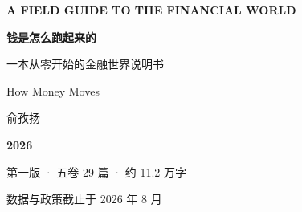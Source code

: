 \thispagestyle{empty}
\vspace*{4.0cm}

\noindent
{\sffamily\scriptsize\bfseries\color{inkfaint} A FIELD GUIDE TO THE FINANCIAL WORLD}

\vspace{8pt}
\noindent{\color{inkblue}\rule{2.4cm}{1.4pt}}

\vspace{1.5cm}

\noindent
{\fontsize{40}{48}\selectfont\bfseries 钱是怎么\textcolor{inkblue}{跑}起来的}

\vspace{0.55cm}

\noindent
{\LARGE\kaishu\color{inkgray} 一本从零开始的金融世界说明书}

\vspace{0.24cm}

\noindent
{\sffamily\normalsize\color{inkfaint} How Money Moves}

\vfill

\noindent
\begin{minipage}[b]{0.5\linewidth}
{\LARGE 俞孜扬}
\end{minipage}%
\begin{minipage}[b]{0.5\linewidth}
\raggedleft
{\fontsize{27}{27}\selectfont\bfseries\color{inkblue} 2026}\par\vspace{3pt}
{\sffamily\scriptsize\color{inkfaint} 第一版 · 五卷 29 篇 · 约 11.2 万字}\par
{\sffamily\scriptsize\color{inkfaint} 数据与政策截止于 2026 年 8 月}
\end{minipage}

\vspace{0.6cm}
\noindent{\color{inkblue}\rule{\linewidth}{2.2pt}}

\clearpage
